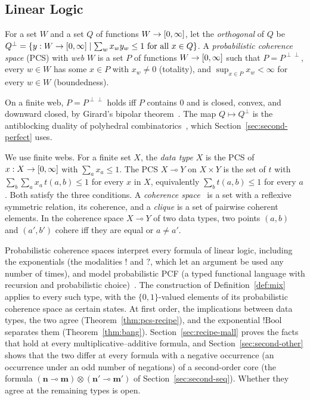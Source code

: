\subsection{Linear Logic}
\label{sec:recipe-linear}

\begin{definition}
\label{def:pcs}
For a set $W$ and a set $Q$ of functions $W \to [0,\infty]$, let the
\emph{orthogonal} of $Q$ be $Q^{\perp} = \{y : W \to [0,\infty] \mid \sum_{w} x_w y_w \le 1 \text{ for all }
x \in Q\}$. A \emph{probabilistic coherence space} (PCS) with \emph{web}
$W$ is a set $P$ of functions $W \to [0,\infty]$ such that
$P = P^{\perp\perp}$, every $w \in W$ has some $x \in P$ with $x_w \ne 0$
(totality), and $\sup_{x \in P} x_w < \infty$ for every $w \in W$
(boundedness).
\end{definition}

\noindent
On a finite web, $P = P^{\perp\perp}$ holds iff $P$ contains $0$ and is
closed, convex, and downward closed, by Girard's bipolar
theorem~\cite{girard2004}. The map $Q \mapsto Q^{\perp}$ is the
antiblocking duality of polyhedral combinatorics~\cite{fulkerson1971},
which Section~\ref{sec:second-perfect} uses.

\noindent
We use finite webs. For a finite set $X$, the \emph{data type} $X$ is the
PCS of $x : X \to [0,\infty]$ with $\sum_a x_a \le 1$. The PCS
$X \multimap Y$ on $X \times Y$ is the set of $t$ with
$\sum_b \sum_a x_a\, t(a,b) \le 1$ for every $x$ in $X$, equivalently
$\sum_b t(a,b) \le 1$ for every $a$. Both satisfy
the three conditions. A \emph{coherence
space}~\cite{girard1987} is a set with a reflexive symmetric relation,
its coherence, and a \emph{clique} is a set of pairwise coherent
elements. In the coherence space $X \multimap Y$ of two data types, two
points $(a,b)$ and $(a',b')$ cohere iff they are equal or $a \ne a'$.

Probabilistic coherence spaces interpret every formula of linear logic,
including the exponentials (the modalities $!$ and $?$, which let an
argument be used any number of times), and model probabilistic PCF (a
typed functional language with recursion and probabilistic
choice)~\cite{danos-ehrhard2011}. The construction of
Definition~\ref{def:mix} applies to every such type, with the
$\{0,1\}$-valued elements of its probabilistic coherence space as
certain states. At first order, the implications between data types,
the two agree (Theorem~\ref{thm:pcs-recipe}), and the exponential $!\mathrm{Bool}$
separates them (Theorem~\ref{thm:bang}).
Section~\ref{sec:recipe-mall} proves the facts that hold at every
multiplicative--additive formula, and Section~\ref{sec:second-other}
shows that the two differ at every formula with a negative occurrence
(an occurrence under an odd number of negations) of a second-order core
(the formula $(\mathbf{n} \multimap \mathbf{m}) \otimes (\mathbf{n'}
\multimap \mathbf{m'})$ of Section~\ref{sec:second-seq}). Whether they agree at the remaining types is open.

